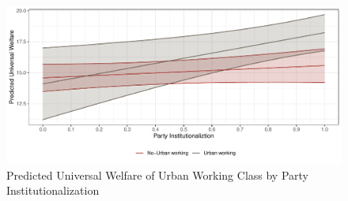 \documentclass[12pt, letterpage, notitlepage]{article}
\begin{document}
\begin{figure}[!ht]
	\centering
	\includegraphics[width=0.85\linewidth]{"2_Figures/Plot5"}
	\caption{Predicted Universal Welfare of Urban Working Class by Party Institutionalization}
	\label{fig:plot5}
\end{figure}

%



%

\end{document}
